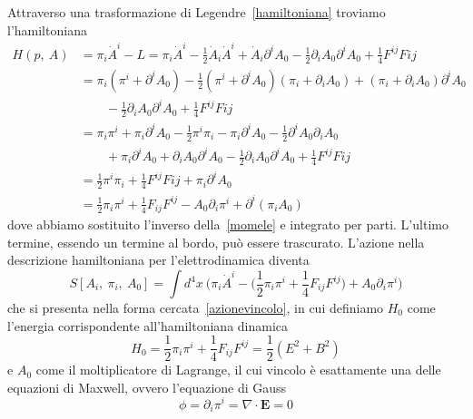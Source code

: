     Attraverso una trasformazione di Legendre~\eqref{hamiltoniana} troviamo l'hamiltoniana  
    \begin{equation*}
    \begin{aligned}
        H(p, ~A) & = \pi_i \dot A^i - L = \pi_i \dot A^i - \frac{1}{2} \dot A_i \dot A^i + \dot A_i \partial^i A_0 - \frac{1}{2} \partial_i A_0 \partial^i A_0 + \frac{1}{4} F^{ij} F{ij}  \\ & = \pi_i (\pi^i + \partial^i A_0) - \frac{1}{2} (\pi^i + \partial^i A_0) (\pi_i + \partial_i A_0) + (\pi_i + \partial_i A_0)\partial^i A_0 \\ & \qquad - \frac{1}{2} \partial_i A_0 \partial^i A_0 + \frac{1}{4} F^{ij} F{ij} \\ & = \pi_i \pi^i + \pi_i \partial^i A_0 - \frac{1}{2}
        \pi^i \pi_i - \pi_i \partial^i A_0 - \frac{1}{2} \partial^i A_0 \partial_i A_0 \\ & \qquad + \pi_i \partial^i A_0 + \partial_i A_0 \partial^i A_0 - \frac{1}{2} \partial_i A_0 \partial^i A_0 + \frac{1}{4} F^{ij} F{ij} \\ & = \frac{1}{2} \pi^i \pi_i + \frac{1}{4} F^{ij} F{ij} + \pi_i \partial^i A_0 \\ & = \frac{1}{2} \pi_i \pi^i + \frac{1}{4} F_{ij} F^{ij} - A_0 \partial_i \pi^i + \partial^i (\pi_i A_0)
    \end{aligned}
    \end{equation*}
    dove abbiamo sostituito l'inverso della~\eqref{momele} e integrato per parti. L'ultimo termine, essendo un termine al bordo, può essere trascurato. L'azione nella descrizione hamiltoniana per l'elettrodinamica diventa
\begin{equation*}
    S[A_i, ~\pi_i, ~A_0] = \int d^4 x ~ \Big ( \pi_i \dot A^i - \Big ( \frac{1}{2} \pi_i \pi^i + \frac{1}{4} F_{ij} F^{ij} \Big) + A_0 \partial_i \pi^i \Big)
\end{equation*}
    che si presenta nella forma cercata~\eqref{azionevincolo}, in cui definiamo $H_0$ come l'energia corrispondente all'hamiltoniana dinamica 
\begin{equation*}
    H_0 = \frac{1}{2} \pi_i \pi^i + \frac{1}{4} F_{ij} F^{ij} = \frac{1}{2} (E^2 + B^2)
\end{equation*}
    e $A_0$ come il moltiplicatore di Lagrange, il cui vincolo è esattamente una delle equazioni di Maxwell, ovvero l'equazione di Gauss
\begin{equation*}
    \phi = \partial_i \pi^i = \nabla \cdot \mathbf E = 0
\end{equation*}

